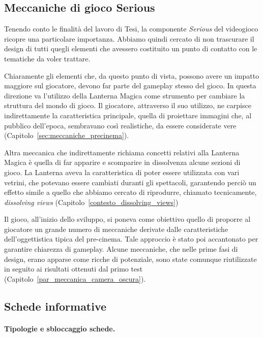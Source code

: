\subsection{Meccaniche di gioco Serious}
\label{sec:meccaniche_serious}

Tenendo conto le finalità del lavoro di Tesi, la componente \textit{Serious} del videogioco ricopre una particolare importanza. Abbiamo quindi cercato di non trascurare il design di tutti quegli elementi che avessero costituito un punto di contatto con le tematiche da voler trattare.

Chiaramente gli elementi che, da questo punto di vista, possono avere un impatto maggiore sul giocatore, devono far parte del gameplay stesso del gioco. In questa direzione va l’utilizzo della Lanterna Magica come strumento per cambiare la struttura del mondo di gioco. Il giocatore, attraverso il suo utilizzo, ne carpisce indirettamente la caratteristica principale, quella di proiettare immagini che, al pubblico dell’epoca, sembravano così realistiche, da essere considerate vere (Capitolo~\ref{sec:meccaniche_precinema}).

Altra meccanica che indirettamente richiama concetti relativi alla Lanterna Magica è quella di far apparire e scomparire in dissolvenza alcune sezioni di gioco. La Lanterna aveva la caratteristica di poter essere utilizzata con vari vetrini, che potevano essere cambiati duranti gli spettacoli, garantendo perciò un effetto simile a quello che abbiamo cercato di riprodurre, chiamato tecnicamente, \textit{dissolving views} (Capitolo~\ref{contesto_dissolving_views})

Il gioco, all’inizio dello sviluppo, si poneva come obiettivo quello di proporre al giocatore un grande numero di meccaniche derivate dalle caratteristiche dell’oggettistica tipica del pre-cinema. Tale approccio è stato poi accantonato per garantire chiarezza di gameplay. Alcune meccaniche, che nelle prime fasi di design, erano apparse come ricche di potenziale, sono state comunque riutilizzate in seguito ai risultati ottenuti dal primo test (Capitolo~\ref{par_meccanica_camera_oscura}).

\subsection{Schede informative}
\label{sec:schede_informative}

\paragraph{Tipologie e sbloccaggio schede.}
\label{par:tipologie_schede}

